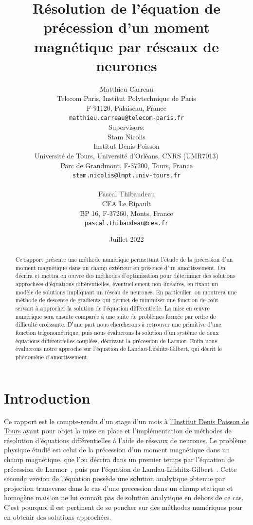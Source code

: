 \documentclass[12pt]{report}
\title{Résolution de l'équation de précession d'un moment magnétique par réseaux de neurones}
\author{
  Matthieu Carreau\\
  Telecom Paris, Institut Polytechnique de Paris\\
  F-91120, Palaiseau, France\\
  \texttt{matthieu.carreau@telecom-paris.fr} \\
  [1em] Supervisors: \\
  Stam Nicolis\\
  Institut Denis Poisson\\
  Université de Tours, Université d'Orléans, CNRS (UMR7013)\\
  Parc de Grandmont, F-37200, Tours, France\\
  \texttt{stam.nicolis@lmpt.univ-tours.fr}\\
  [1em] \\
  Pascal Thibaudeau\\
  CEA Le Ripault\\
  BP 16, F-37260, Monts, France\\
  \texttt{pascal.thibaudeau@cea.fr}
}
\date{Juillet 2022}
\begin{document}
\maketitle

\begin{abstract}
    Ce rapport présente une méthode numérique permettant l'étude de la préces\-sion d'un moment magnétique dans un champ extérieur en présence d'un amortissement.
    On décrira et mettra en {\oe}uvre des méthodes d'optimisation pour déterminer des solutions approchées d'équations différentielles, éventuellement non-linéaires, en fixant un modèle de solutions impliquant un réseau de neurones. 
    En particulier, on montrera une méthode de descente de gradients qui permet de minimiser une fonction de coût servant à approcher la solution de l'équation différentielle.
    La mise en {\oe}uvre numérique sera ensuite comparée à une suite de problèmes formée par ordre de difficulté croissante. 
    D'une part nous chercherons à retrouver une primitive d'une fonction trigonométrique, puis nous évaluerons la solution d'un système de deux équations différentielles couplées, décrivant la précession de Larmor.
    Enfin nous évaluerons notre approche sur l'équation de Landau-Lifshitz-Gilbert, qui décrit le phénomène d'amortissement.
\end{abstract}
    
\tableofcontents{}

\chapter{Introduction}
\label{chap:introduction}

Ce rapport est le compte-rendu d'un stage d'un mois à \href{https://www.idpoisson.fr}{l'Institut Denis Poisson de Tours} ayant pour objet la mise en place et l'implémentation de méthodes de résolution d'équations différentielles à l'aide de réseaux de neurones. 
Le problème physique étudié est celui de la précession d'un moment magnétique dans un champ magnétique, que l'on décrira dans un premier temps par l'équation de précession de Larmor~\cite{PrecessionLarmor}, puis par l'équation de Landau-Lifshitz-Gilbert~\cite{EquationGilbert}.
Cette seconde version de l'équation possède une solution analytique obtenue par projection transverse dans le cas d'une precession dans un champ statique et homogène mais on ne lui connaît pas de solution analytique en dehors de ce cas.
C'est pourquoi il est pertinent de se pencher sur des méthodes numériques pour en obtenir des solutions approchées.
\end{document}
